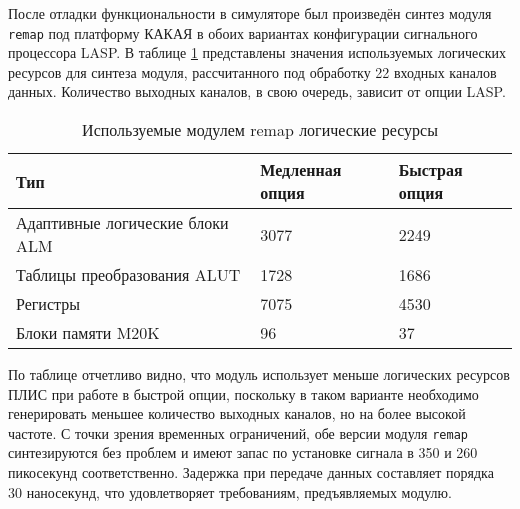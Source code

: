 После отладки функциональности в симуляторе был произведён синтез модуля \texttt{remap} под платформу КАКАЯ в обоих вариантах конфигурации сигнального процессора LASP. В таблице \ref{tab:remap_util} представлены значения используемых логических ресурсов для синтеза модуля, рассчитанного под обработку 22 входных каналов данных. Количество выходных каналов, в свою очередь, зависит от опции LASP.\par
\begin{table}[ht]
    \caption{Используемые модулем remap логические ресурсы}
    \begin{tabular}{|p{}|p{}|p{}|}
        \hline
        Тип & Медленная опция & Быстрая опция \\
        \hline
        Адаптивные логические блоки ALM & 3077 & 2249 \\
        \hline
        Таблицы преобразования ALUT & 1728 & 1686 \\
        \hline
        Регистры & 7075 & 4530 \\
        \hline
        Блоки памяти M20K & 96 & 37 \\
        \hline
    \end{tabular}
    \label{tab:remap_util}
\end{table}
По таблице отчетливо видно, что модуль использует меньше логических ресурсов ПЛИС при работе в быстрой опции, поскольку в таком варианте необходимо генерировать меньшее количество выходных каналов, но на более высокой частоте. С точки зрения временных ограничений, обе версии модуля \texttt{remap} синтезируются без проблем и имеют запас по установке сигнала в 350 и 260 пикосекунд соответственно. Задержка при передаче данных составляет порядка 30 наносекунд, что удовлетворяет требованиям, предъявляемых модулю.\par

